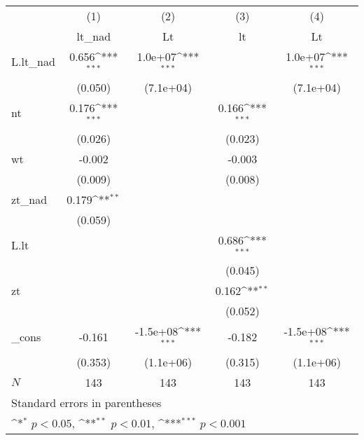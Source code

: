 {
\def\sym#1{\ifmmode^{#1}\else\(^{#1}\)\fi}
\begin{tabular}{l*{4}{c}}
\hline\hline
          &\multicolumn{1}{c}{(1)}&\multicolumn{1}{c}{(2)}&\multicolumn{1}{c}{(3)}&\multicolumn{1}{c}{(4)}\\
          &\multicolumn{1}{c}{lt\_nad}&\multicolumn{1}{c}{Lt}&\multicolumn{1}{c}{lt}&\multicolumn{1}{c}{Lt}\\
\hline
L.lt\_nad  &    0.656\sym{***}&  1.0e+07\sym{***}&                  &  1.0e+07\sym{***}\\
          &  (0.050)         &(7.1e+04)         &                  &(7.1e+04)         \\
nt        &    0.176\sym{***}&                  &    0.166\sym{***}&                  \\
          &  (0.026)         &                  &  (0.023)         &                  \\
wt        &   -0.002         &                  &   -0.003         &                  \\
          &  (0.009)         &                  &  (0.008)         &                  \\
zt\_nad    &    0.179\sym{**} &                  &                  &                  \\
          &  (0.059)         &                  &                  &                  \\
L.lt      &                  &                  &    0.686\sym{***}&                  \\
          &                  &                  &  (0.045)         &                  \\
zt        &                  &                  &    0.162\sym{**} &                  \\
          &                  &                  &  (0.052)         &                  \\
\_cons    &   -0.161         & -1.5e+08\sym{***}&   -0.182         & -1.5e+08\sym{***}\\
          &  (0.353)         &(1.1e+06)         &  (0.315)         &(1.1e+06)         \\
\hline
\(N\)     &      143         &      143         &      143         &      143         \\
\hline\hline
\multicolumn{5}{l}{\footnotesize Standard errors in parentheses}\\
\multicolumn{5}{l}{\footnotesize \sym{*} \(p<0.05\), \sym{**} \(p<0.01\), \sym{***} \(p<0.001\)}\\
\end{tabular}
}
